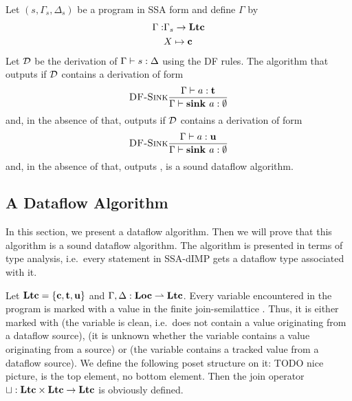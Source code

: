 \begin{corollary}
    Let $(s, \Gamma_s, \Delta_s)$ be a program in SSA form and define $\Gamma$ by
    \begin{align*}
        \Gamma: &\Gamma_s \to \textbf{Ltc}\\
        &X \mapsto \textbf{c}
    \end{align*}
    Let $\operatorname{\mathcal{D}}$ be the derivation of $\Gamma \vdash {s}: \Delta$ using the DF rules.
    The algorithm that outputs  if $\operatorname{\mathcal{D}}$ contains a derivation of form
    \begin{equation*}
        \textsc{DF-Sink}\frac{\displaystyle \Gamma \vdash {a}: \textbf{t}}{\displaystyle \Gamma \vdash {\textbf{sink }{a}}: \emptyset}
    \end{equation*}
    and, in the absence of that, outputs  if $\operatorname{\mathcal{D}}$ contains a derivation of form
    \begin{equation*}
        \textsc{DF-Sink}\frac{\displaystyle \Gamma \vdash {a}: \textbf{u}}{\displaystyle \Gamma \vdash {\textbf{sink }{a}}: \emptyset}
    \end{equation*}
    and, in the absence of that, outputs , is a sound dataflow algorithm.
\end{corollary}

\iffalse
\subsection{A Dataflow Algorithm}
In this section, we present a dataflow algorithm.
Then we will prove that this algorithm is a sound dataflow algorithm.
The algorithm is presented in terms of type analysis, i.e.\ every statement in 
SSA-dIMP gets a dataflow type associated with it.

Let $\textbf{Ltc} = \{\textbf{c}, \textbf{t}, \textbf{u}\}$ and
$\Gamma, \Delta: \textbf{Loc} \rightharpoonup \textbf{Ltc}$.
Every variable encountered in the program is marked with a value in the finite join-semilattice
\lattice.
Thus, it is either marked with \lclean (the variable
is clean, i.e.\ does not contain a value originating from a dataflow source), \lunknown
(it is unknown whether the variable contains a value originating from a source) or \ltracked
(the variable contains a tracked value from a dataflow source).
We define the following poset structure on it:
TODO nice picture, \lunknown is the top element, no bottom element.
Then the join operator $\mathbin\sqcup: \textbf{Ltc} \times \textbf{Ltc} \to \textbf{Ltc}$ is 
obviously defined.

